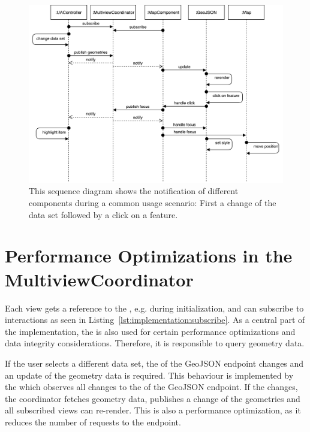 \begin{figure}[ht]
  \centering
  \includegraphics[width=\textwidth]{figures/implementation/SequenceDiagram}
  \caption{%
    This sequence diagram shows the notification of different components during a common usage scenario:
    First a change of the data set followed by a click on a feature.
  }\label{fig:implementation:sequence-diagram}
\end{figure}


\section{Performance Optimizations in the MultiviewCoordinator}

Each view gets a reference to the , e.g. during initialization, and can subscribe to interactions as seen in Listing~\ref{lst:implementation:subscribe}.
As a central part of the implementation, the  is also used for certain performance optimizations and data integrity considerations.
Therefore, it is responsible to query geometry data.

If the user selects a different data set, the  of the GeoJSON endpoint changes and an update of the geometry data is required.
This behaviour is implemented by the  which observes all changes to the  of the GeoJSON endpoint.
If the  changes, the coordinator fetches geometry data, publishes a change of the geometries and all subscribed views can re-render.
This is also a performance optimization, as it reduces the number of requests to the  endpoint.

